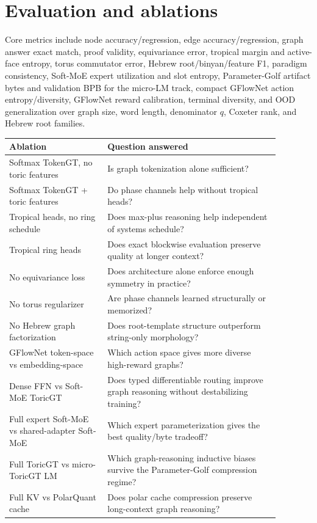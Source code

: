 \documentclass[11pt]{article}
\theoremstyle{definition}
\theoremstyle{plain}
\theoremstyle{remark}
\numberwithin{equation}{section}
\begin{document}
\section{Evaluation and ablations}

Core metrics include node accuracy/regression, edge accuracy/regression, graph answer exact match, proof validity, equivariance error, tropical margin and active-face entropy, torus commutator error, Hebrew root/binyan/feature F1, paradigm consistency, Soft-MoE expert utilization and slot entropy, Parameter-Golf artifact bytes and validation BPB for the micro-LM track, compact GFlowNet action entropy/diversity, GFlowNet reward calibration, terminal diversity, and OOD generalization over graph size, word length, denominator $q$, Coxeter rank, and Hebrew root families.

\begin{longtable}{p{0.32\linewidth}p{0.56\linewidth}}
\toprule
Ablation & Question answered \\
\midrule
\endhead
Softmax TokenGT, no toric features & Is graph tokenization alone sufficient? \\
Softmax TokenGT + toric features & Do phase channels help without tropical heads? \\
Tropical heads, no ring schedule & Does max-plus reasoning help independent of systems schedule? \\
Tropical ring heads & Does exact blockwise evaluation preserve quality at longer context? \\
No equivariance loss & Does architecture alone enforce enough symmetry in practice? \\
No torus regularizer & Are phase channels learned structurally or memorized? \\
No Hebrew graph factorization & Does root-template structure outperform string-only morphology? \\
GFlowNet token-space vs embedding-space & Which action space gives more diverse high-reward graphs? \\
Dense FFN vs Soft-MoE ToricGT & Does typed differentiable routing improve graph reasoning without destabilizing training? \\
Full expert Soft-MoE vs shared-adapter Soft-MoE & Which expert parameterization gives the best quality/byte tradeoff? \\
Full ToricGT vs micro-ToricGT LM & Which graph-reasoning inductive biases survive the Parameter-Golf compression regime? \\
Full KV vs PolarQuant cache & Does polar cache compression preserve long-context graph reasoning? \\
\bottomrule
\end{longtable}
\end{document}

